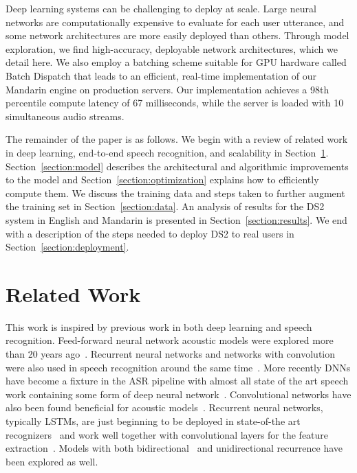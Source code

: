 \documentclass{article}
\begin{document}
Deep learning systems can be challenging to deploy at scale.  Large neural networks are computationally expensive to evaluate for each user utterance, and some network architectures are more easily deployed than others. Through model exploration, we find high-accuracy, deployable network architectures, which we detail here. We also employ a batching scheme suitable for GPU hardware called Batch Dispatch that leads to an efficient, real-time implementation of our Mandarin engine on production servers.  Our implementation achieves a 98th percentile compute latency of 67 milliseconds, while the server is loaded with 10 simultaneous audio streams.

The remainder of the paper is as follows. We begin with a review of related work in deep learning, end-to-end speech recognition, and scalability in Section~\ref{section:related}. Section~\ref{section:model} describes the architectural and algorithmic improvements to the model and Section~\ref{section:optimization} explains how to efficiently compute them. We discuss the training data and steps taken to further augment the training set in Section~\ref{section:data}. An analysis of results for the DS2 system in English and Mandarin is presented in Section~\ref{section:results}. We end with a description of the steps needed to deploy DS2 to real users in Section~\ref{section:deployment}.

\section{Related Work}
\label{section:related}

This work is inspired by previous work in both deep learning and speech recognition. Feed-forward neural network acoustic models were explored more than 20 years ago~\cite{bourlard93, renals1994, ellis1999}. Recurrent neural networks and networks with convolution were also used in speech recognition around the same time~\cite{robinson1996, waibel1989}. More recently DNNs have become a fixture in the ASR pipeline with almost all state of the art speech work containing some form of deep neural network~\cite{mohamed2011, hinton2012, dahl2011a,dahl2011, jaitly2012, seide2011b}. Convolutional networks have also been found beneficial for acoustic models~\cite{abdelhamid2012, sainath2013cnn}. Recurrent neural networks, typically LSTMs, are just beginning to be deployed in state-of-the art recognizers~\cite{graves2013drnn, sak2014, sak2014b} and work well together with convolutional layers for the feature extraction~\cite{sainath2015}.  Models with both bidirectional~\cite{graves2013drnn} and unidirectional recurrence have been explored as well.
\end{document}
